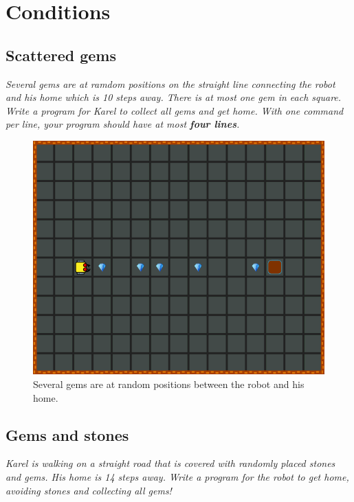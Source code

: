 {{%

\setcounter{section}{6}
\section{Conditions}

\subsection{Scattered gems}

{\em Several gems are at ramdom positions on the straight line connecting the robot and his 
home which is 10 steps away. There is at most one gem in each square. Write a program for 
Karel to collect all gems and get home. With one command per 
line, your program should have at most {\bf four lines}.}

\newpage
\begin{figure}[!ht]
\begin{center}
\includegraphics[height=0.4\textwidth]{img/d01.png}
\end{center}
\vspace{-4mm}
\caption{Several gems are at random positions between the robot and his home.}
\label{fig:d01}
\end{figure}


\subsection{Gems and stones}

{\em Karel is walking on a straight road that is covered with 
randomly placed stones and gems. His home is 14 steps away. 
Write a program for the robot to get home, avoiding stones 
and collecting all gems!}


}}
